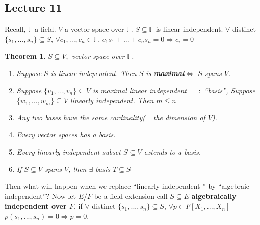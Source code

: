 \documentclass[11pt]{article}
\newtheorem{thm}{Theorem}[section]
\newcommand{\bbf}{\mathbb F}
\newcommand{\Lrta}{\Longrightarrow}
\newcommand{\Llrta}{\Longleftrightarrow}
\begin{document}
\subsection{Lecture 11}

Recall, $\bbf$ a field. $V$ a vector space over $\bbf$. $S\subseteq \bbf$ is linear independent. $\forall $ distinct $\{s_1,...,s_n\}\subseteq S$, $\forall c_1,...,c_n\in\bbf$, $c_1 s_1+...+c_n s_n=0\Lrta c_i=0$

\begin{thm}
$S\subseteq V,$ vector space over $\bbf$. 
\begin{enumerate}[label=(\alph*)]
\item Suppose $S$ is linear independent. Then $S$ is \textbf{maximal}$\Llrta$ $S$ spans $V$.
\item Suppose $\{v_1,...,v_n\}\subseteq V$ is maximal linear independent $=:$ ``basis'', Suppose $\{w_1,...,w_m\}\subseteq V$ linearly independent. Then $m\leq n$
\item  Any two bases have the same cardinality(= the dimension of $V$).
\item Every vector spaces has a basis.
\item Every linearly independent subset $S\subseteq V$ extends to a basis.
\item If $S\subseteq V$ spans $V$, then $\exists $ basis $T\subseteq S$
\end{enumerate}
\end{thm}

Then what will happen when we replace ``linearly independent '' by ``algebraic independent''?
Now let $E/F$ be a field extension call $S\subseteq E$ \textbf{algebraically independent over $F$}, if $\forall $ distinct $\{s_1,...,s_n\}\subseteq S$, $\forall p\in F[X_1,...,X_n]$ $p(s_1,...,s_n)=0\Lrta p=0$.
\end{document}
